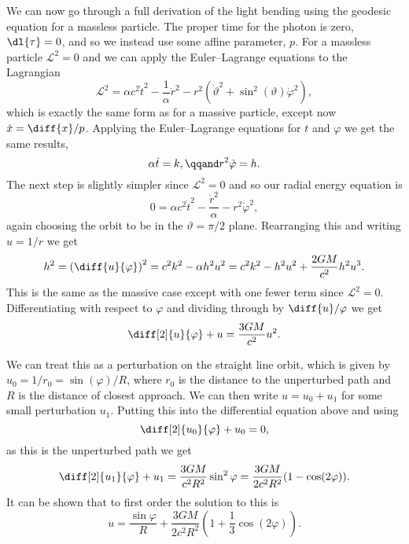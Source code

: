 \documentclass[fleqn]{NotesClass}
\newcommand*{\lagrangian}{\mathcal{L}}
\begin{document}
    We can now go through a full derivation of the light bending using the geodesic equation for a massless particle.
    The proper time for the photon is zero, \(\dl{\tau} = 0\), and so we instead use some affine parameter, \(p\).
    For a massless particle \(\lagrangian^2 = 0\) and we can apply the Euler--Lagrange equations to the Lagrangian
    \begin{equation}
        \lagrangian^2 = \alpha c^2\dot{t}^2 - \frac{1}{\alpha}\dot{r}^2 - r^2(\dot{\vartheta}^2 + \sin^2(\vartheta) \dot{\varphi}^2),
    \end{equation}
    which is exactly the same form as for a massive particle, except now \(\dot{x} = \diff{x}/{p}\).
    Applying the Euler--Lagrange equations for \(t\) and \(\varphi\) we get the same results,
    \begin{equation}
        \alpha\dot{t} = k, \qqand r^2\dot{\varphi} = h.
    \end{equation}
    The next step is slightly simpler since \(\lagrangian^2 = 0\) and so our radial energy equation is
    \begin{equation}
        0 = \alpha c^2 \dot{t}^2 - \frac{\dot{r}^2}{\alpha} - r^2 \dot{\varphi}^2,
    \end{equation}
    again choosing the orbit to be in the \(\vartheta = \pi/2\) plane.
    Rearranging this and writing \(u = 1/r\) we get
    \begin{equation}
        h^2 = \left( \diff{u}{\varphi} \right)^2 = c^2k^2 - \alpha h^2 u^2 = c^2k^2 - h^2u^2 + \frac{2GM}{c^2}h^2u^3.
    \end{equation}
    This is the same as the massive case except with one fewer term since \(\lagrangian^2 = 0\).
    Differentiating with respect to \(\varphi\) and dividing through by \(\diff{u}/{\varphi}\) we get
    \begin{equation}
        \diff[2]{u}{\varphi} + u = \frac{3GM}{c^2}u^2.
    \end{equation}
    
    We can treat this as a perturbation on the straight line orbit, which is given by \(u_0 = 1/r_0 = \sin(\varphi)/R\), where \(r_0\) is the distance to the unperturbed path and \(R\) is the distance of closest approach.
    We can then write \(u = u_0 + u_1\) for some small perturbation \(u_1\).
    Putting this into the differential equation above and using
    \begin{equation}
        \diff[2]{u_0}{\varphi} + u_0 = 0,
    \end{equation}
    as this is the unperturbed path we get
    \begin{equation}
        \diff[2]{u_1}{\varphi} + u_1 = \frac{3GM}{c^2R^2} \sin^2\varphi = \frac{3GM}{2c^2R^2}(1 - \cos(2\varphi)).
    \end{equation}
    It can be shown that to first order the solution to this is
    \begin{equation}
        u = \frac{\sin\varphi}{R} + \frac{3GM}{2c^2R^2} \left( 1 + \frac{1}{3}\cos(2\varphi) \right).
    \end{equation}
    
\end{document}
